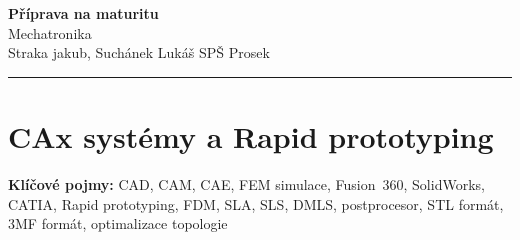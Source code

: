 \documentclass[a4paper,10pt]{article}
\begin{document}
\begin{minipage}[t]{0.75\textwidth}
    {\Huge\bfseries\color{accent} Příprava na maturitu}\\[4pt]
    {\large\color{stripeblue} Mechatronika}\\[2pt]
    \textcolor{medgray}{\small Straka jakub, Suchánek Lukáš \quad SPŠ Prosek }
\end{minipage}
\hfill
\begin{minipage}[t]{0.22\textwidth}
    \raggedleft
\end{minipage}

\vspace{6pt}
\noindent\color{accent}\rule{\linewidth}{1.5pt}
\vspace{2pt}

\section{CAx systémy a Rapid prototyping}

\begin{pojmybox}
\textbf{Klíčové pojmy:}
CAD, CAM, CAE, FEM simulace, Fusion~360, SolidWorks, CATIA,
Rapid prototyping, FDM, SLA, SLS, DMLS, postprocesor,
STL formát, 3MF formát, optimalizace topologie
\end{pojmybox}
\end{document}
